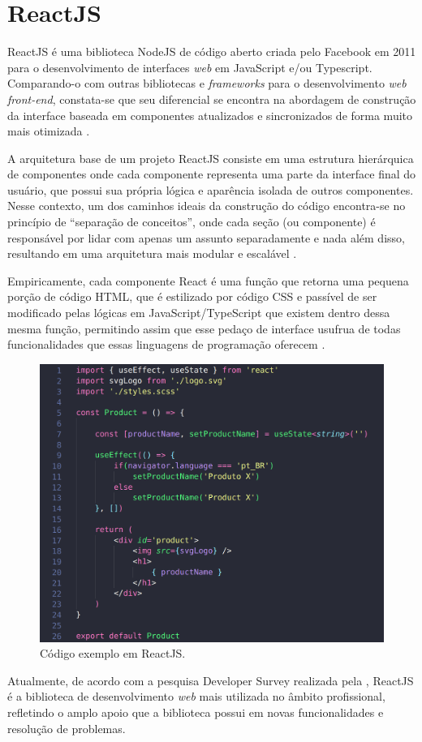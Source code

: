 \section{ReactJS}
\label{sec:reactJS}
ReactJS é uma biblioteca NodeJS de código aberto criada pelo Facebook em 2011 para o desenvolvimento de interfaces \textit{web} em JavaScript e/ou Typescript. Comparando-o com outras bibliotecas e \textit{frameworks} para o desenvolvimento \textit{web front-end}, constata-se que seu diferencial se encontra na abordagem de construção da interface baseada em componentes atualizados e sincronizados de forma muito mais otimizada \cite{Source2023}.

A arquitetura base de um projeto ReactJS consiste em uma estrutura hierárquica de componentes onde cada componente representa uma parte da interface final do usuário, que possui sua própria lógica e aparência isolada de outros componentes. Nesse contexto, um dos caminhos ideais da construção do código encontra-se no princípio de “separação de conceitos”, onde cada seção (ou componente) é responsável por lidar com apenas um assunto separadamente e nada além disso, resultando em uma arquitetura mais modular e escalável \cite{Qawwas2022}.

Empiricamente, cada componente React é uma função que retorna uma pequena porção de código HTML, que é estilizado por código CSS e passível de ser modificado pelas lógicas em JavaScript/TypeScript que existem dentro dessa mesma função, permitindo assim que esse pedaço de interface usufrua de todas funcionalidades que essas linguagens de programação oferecem \cite{Qawwas2022}.

\begin{figure}[H]
    \centering
    \caption{Código exemplo em ReactJS.}
    \label{fig:reactJS}
    \includegraphics[width=.7\textwidth]{data/figures/react.png}
\end{figure}

Atualmente, de acordo com a pesquisa Developer Survey realizada pela , ReactJS é a biblioteca de desenvolvimento \textit{web} mais utilizada no âmbito profissional, refletindo o amplo apoio que a biblioteca possui em novas funcionalidades e resolução de problemas.